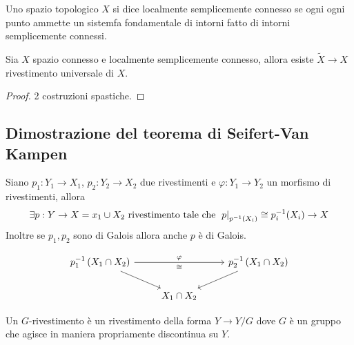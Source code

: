\documentclass[]{article}
\begin{document}
\begin{definition}  \nl
    Uno spazio topologico $X$ si dice localmente semplicemente connesso se ogni ogni punto ammette un sistemfa fondamentale
    di intorni fatto di intorni semplicemente connessi.
\end{definition}

\begin{theorem}  \nl
    Sia $X$ spazio connesso e localmente semplicemente connesso, allora esiste $\tilde{X} \to X$ rivestimento universale di $X$.
\end{theorem}

\begin{proof}
    2 costruzioni spastiche.
\end{proof}

\subsection{Dimostrazione del teorema di Seifert-Van Kampen}

\begin{lemma} \nl
    Siano $p_1: Y_1 \to X_1$, $p_2: Y_2 \to X_2$ due rivestimenti e $\varphi: Y_1 \to Y_2$ un morfismo di rivestimenti, allora
    \[
        \exists p: Y \to X = x_1 \cup X_2 \text{ rivestimento tale che } \left. p \right|_{p^{-1}(X_i)} \cong p_i^{-1}(X_i) \to X
    \]
    Inoltre se $p_1, p_2$ sono di Galois allora anche $p$ \`e di Galois.

    \[\begin{tikzcd}
	{p_1^{-1}\left(X_1 \cap X_2\right)} && {p_2^{-1}\left(X_1 \cap X_2\right)} \\
	& {X_1 \cap X_2}
    \arrow["\varphi", "\cong"', from=1-1, to=1-3]
	\arrow[from=1-1, to=2-2]
	\arrow[from=1-3, to=2-2]
    \end{tikzcd}\]
\end{lemma}

\begin{definition} [$G$-rivestimento] \nl
    Un $G$-rivestimento \`e un rivestimento della forma $Y \to Y/G$ dove $G$ \`e un gruppo che agisce in
    maniera propriamente discontinua su $Y$.
\end{definition}
\end{document}
